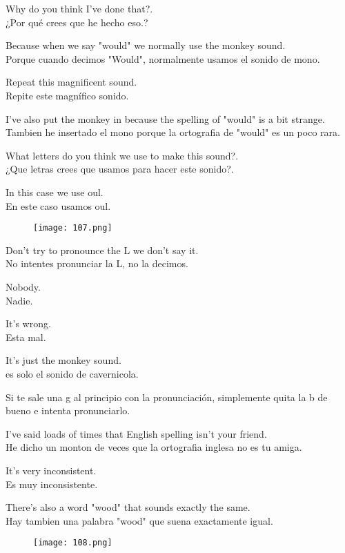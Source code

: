 Why do you think I've done that?.\\
¿Por qué crees que he hecho eso.?

Because when we say "would" we normally use the monkey sound.\\
Porque cuando decimos "Would", normalmente usamos el sonido de mono.

Repeat this magnificent sound.\\
Repite este magnífico sonido.

I've also put the monkey in because the spelling of "would" is a bit strange.\\
Tambien he insertado el mono porque la ortografia de "would" es un poco rara.

What letters do you think we use to make this sound?.\\
¿Que letras crees que usamos para hacer este sonido?.

In this case we use oul.\\
En este caso usamos oul.

\begin{figure}[H]
\centering
\texttt{[image: 107.png]}
\end{figure}

Don't try to pronounce the L we don't say it.\\
No intentes pronunciar la L, no la decimos.

Nobody.\\
Nadie.

It's wrong.\\
Esta mal.

It's just the monkey sound.\\
es solo el sonido de cavernicola.

Si te sale una g al principio con la pronunciación, simplemente quita la
b de bueno e intenta pronunciarlo.

I've said loads of times that English spelling isn't your friend.\\
He dicho un monton de veces que la ortografia inglesa no es tu amiga.

It's very inconsistent.\\
Es muy inconsistente.

There's also a word "wood" that sounds exactly the same.\\
Hay tambien una palabra "wood" que suena exactamente igual.

\begin{figure}[H]
\centering
\texttt{[image: 108.png]}
\end{figure}


